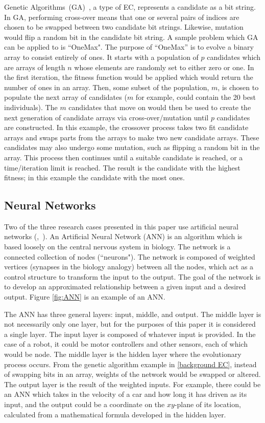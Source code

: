 \documentclass{sig-alternate}
\begin{document}
Genetic Algorithms~(GA)~\cite{wiki:GeneticAlgorithms}, a type of EC, represents a candidate as a bit string. In GA, performing cross-over means that one or several pairs of indices are chosen to be swapped between two candidate bit strings. Likewise, mutation would flip a random bit in the candidate bit string. A sample problem which GA can be applied to is ``OneMax". The purpose of ``OneMax'' is to evolve a binary array to consist entirely of ones. It starts with a population of $p$ candidates which are arrays of length $n$ whose elements are randomly set to either zero or one. In the first iteration, the fitness function would be applied which would return the number of ones in an array. Then, some subset of the population, $m$, is chosen to populate the next array of candidates ($m$ for example, could contain the 20 best individuals). The $m$ candidates that move on would then be used to create the next generation of candidate arrays via cross-over/mutation until $p$ candidates are constructed. In this example, the crossover process takes two fit candidate arrays and swaps parts from the arrays to make two new candidate arrays. These candidates may also undergo some mutation, such as flipping a random bit in the array. This process then continues until a suitable candidate is reached, or a time/iteration limit is reached. The result is the candidate with the highest fitness; in this example the candidate with the most ones.
  
\subsection{Neural Networks}
	Two of the three research cases presented in this paper use artificial neural networks (\cite{Moore:2013:ESK:2463372.2463402},~\cite{Pretorius:2009:TAN:1632149.1632171}). An Artificial Neural Network (ANN) \cite{wiki:robotics} is an algorithm which is based loosely on the central nervous system in biology. The network is a connected collection of nodes (``neurons"). The network is composed of weighted vertices (synapses in the biology analogy) between all the nodes, which act as a control structure to transform the input to the output. The goal of the network is to develop an approximated relationship between a given input and a desired output. Figure \ref{fig:ANN} is an example of an ANN.

	 The ANN has three general layers: input, middle, and output. The middle layer is not necessarily only one layer, but for the purposes of this paper it is considered a single layer. The input layer is composed of whatever input is provided. In the case of a robot, it could be motor controllers and other sensors, each of which would be node. The middle layer is the hidden layer where the evolutionary process occurs. From the genetic algorithm example in \ref{background EC}, instead of swapping bits in an array, weights of the network would be swapped or altered. The output layer is the result of the weighted inputs. For example, there could be an ANN which takes in the velocity of a car and how long it has driven as its input, and the output could be a coordinate on the $xy$-plane of its location, calculated from a mathematical formula developed in the hidden layer.  
\end{document}
